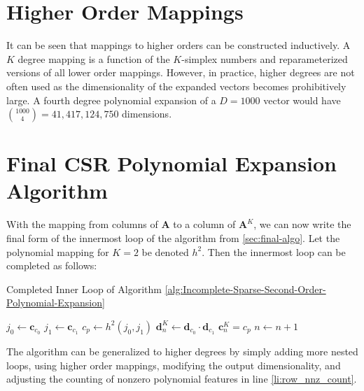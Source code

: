 \documentclass{article}
\begin{document}
\section{Higher Order Mappings}
It can be seen that mappings to higher orders can be constructed inductively.
A $K$ degree mapping is a function of the $K$-simplex numbers and reparameterized versions of all lower order mappings.
However, in practice, higher degrees are not often used as the dimensionality of the expanded vectors becomes prohibitively large.
A fourth degree polynomial expansion of a $D=1000$ vector would have $\binom{1000}{4} = 41,417,124,750$ dimensions.

\section{Final CSR Polynomial Expansion Algorithm}
With the mapping from columns of $\bm{A}$ to a column of $\bm{A}^K$, we can now write the final form of the innermost loop of the algorithm from \ref{sec:final-algo}.
Let the polynomial mapping for $K=2$ be denoted $h^2$.
Then the innermost loop can be completed as follows: %

\begin{algorithm}[H]
   \caption*{Completed Inner Loop of Algorithm \ref{alg:Incomplete-Sparse-Second-Order-Polynomial-Expansion}}
   \label{alg:Inner-Loop-of-Completed-Sparse-Second-Order-Polynomial-Expansion}
\begin{algorithmic}[1]
      \STATE $j_0 \gets \bm{c}_{c_0}$
      \STATE $j_1 \gets \bm{c}_{c_1}$
      \STATE $c_p \gets h^2(j_0, j_1)$
      \STATE $\bm{d}^K_{n} \gets \bm{d}_{c_0} \cdot \bm{d}_{c_1}$
      \STATE $\bm{c}^K_{n} = c_p$
      \STATE $n \gets n + 1$
  \ENDFOR
\end{algorithmic}
\end{algorithm}

The algorithm can be generalized to higher degrees by simply adding more nested loops, using higher order mappings, modifying the output dimensionality, and adjusting the counting of nonzero polynomial features in line \ref{li:row_nnz_count}.
\end{document}
